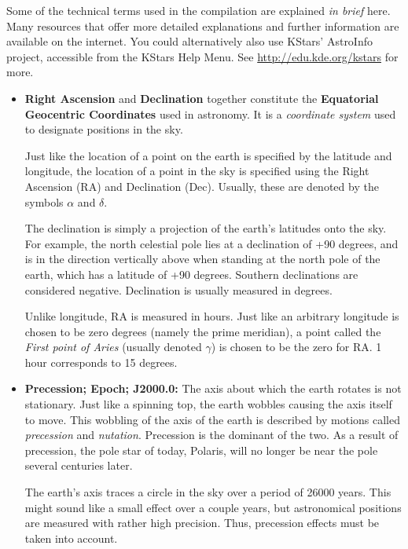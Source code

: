 Some of the technical terms used in the compilation are explained
\emph{in brief} here. Many resources that offer more detailed
explanations and further information are available on the
internet. You could alternatively also use KStars' AstroInfo project,
accessible from the KStars Help Menu. See
\url{http://edu.kde.org/kstars} for more.

\begin{itemize}
\item \textbf{Right Ascension} and \textbf{Declination} together
  constitute the \textbf{Equatorial Geocentric Coordinates} used in
  astronomy. It is a \emph{coordinate system} used to designate
  positions in the sky.

  Just like the location of a point on the earth is specified by the
  latitude and longitude, the location of a point in the sky is
  specified using the Right Ascension (RA) and Declination
  (Dec). Usually, these are denoted by the symbols $\alpha$ and
  $\delta$.
  
  The declination is simply a projection of the earth's latitudes onto
  the sky. For example, the north celestial pole lies at a declination
  of +90 degrees, and is in the direction vertically above when
  standing at the north pole of the earth, which has a latitude of +90
  degrees. Southern declinations are considered negative. Declination
  is usually measured in degrees.

  Unlike longitude, RA is measured in hours. Just like an arbitrary
  longitude is chosen to be zero degrees (namely the prime meridian),
  a point called the \emph{First point of Aries} (usually denoted
  $\gamma$) is chosen to be the zero for RA. 1 hour corresponds to 15
  degrees.

\item \textbf{Precession; Epoch; J2000.0:} The axis about which the
  earth rotates is not stationary. Just like a spinning top, the earth
  wobbles causing the axis itself to move. This wobbling of the axis
  of the earth is described by motions called \emph{precession} and
  \emph{nutation}. Precession is the dominant of the two. As a result
  of precession, the pole star of today, Polaris, will no longer be
  near the pole several centuries later.

  The earth's axis traces a circle in the sky over a period of 26000
  years. This might sound like a small effect over a couple years, but
  astronomical positions are measured with rather high
  precision. Thus, precession effects must be taken into account.


\end{itemize}

